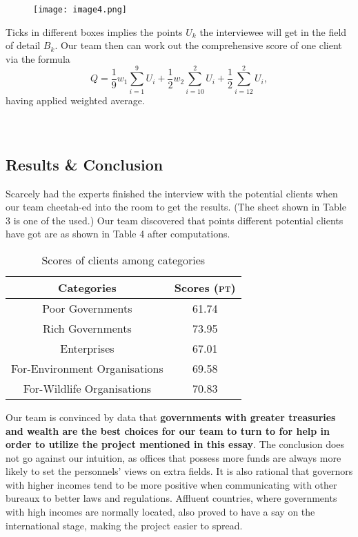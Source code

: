 \documentclass[12pt]{article}
\begin{document}
\begin{figure*}[h]
\centering
	\texttt{[image: image4.png]}
	\setcounter{table}{2}
\end{figure*}

Ticks in different boxes implies the points $U_k$ the interviewee will get in the field of detail $B_k$. Our team then can work out the comprehensive score of one client via the formula
\begin{equation}
	Q=\frac{1}{9}w_1\sum_{i=1}^9U_i+\frac{1}{2}w_2\sum_{i=10}^{2}U_i+\frac{1}{2}\sum_{i=12}^{2}U_i,
\end{equation}
having applied weighted average.
\\ \\ \\
\subsection{Results \& Conclusion}
Scarcely had the experts finished the interview with the potential clients when our team cheetah-ed into the room to get the results. (The sheet shown in Table 3 is one of the used.) Our team discovered that points different potential clients have got are as shown in Table 4 after computations.

\begin{wraptable}{r}{0.5\textwidth}
\centering
\begin{tabular}{c|c}
	Categories & Scores (\textsc{pt})\\
	\hline
	Poor Governments & 61.74\\
	Rich Governments & 73.95\\
	Enterprises & 67.01\\
	For-Environment Organisations & 69.58\\
	For-Wildlife Organisations & 70.83
\end{tabular}
\setcounter{table}{3}
\caption{Scores of clients among categories}
\end{wraptable}

Our team is convinced by data that \textbf{governments with greater treasuries and wealth are the best choices for our team to turn to for help in order to utilize the project mentioned in this essay}. The conclusion does not go against our intuition, as offices that possess more funds are always more likely to set the personnels' views on extra fields. It is also rational that governors with higher incomes tend to be more positive when communicating with other bureaux to better laws and regulations. Affluent countries, where governments with high incomes are normally located, also proved to have a say on the international stage, making the project easier to spread.
\end{document}
